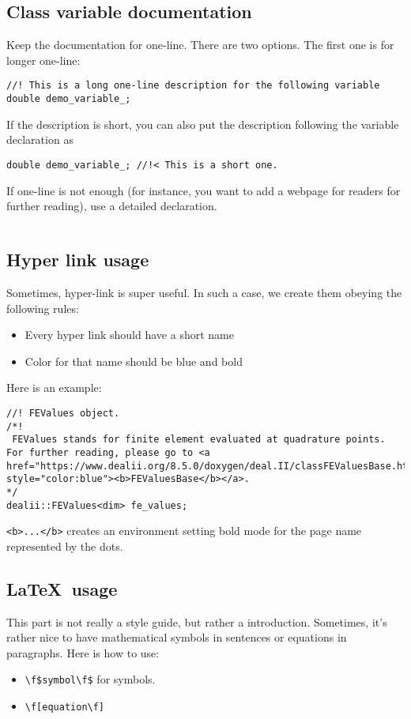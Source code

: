 \documentclass[openany]{book}
\newcommand{\latex}{\LaTeX}
\begin{document}
\subsection{Class variable documentation}
Keep the documentation for one-line. There are two options. The first one is for longer one-line:
\begin{lstlisting}
//! This is a long one-line description for the following variable
double demo_variable_;
\end{lstlisting}

If the description is short, you can also put the description following the variable declaration as
\begin{lstlisting}
double demo_variable_; //!< This is a short one.
\end{lstlisting}

If one-line is not enough (for instance, you want to add a webpage for readers for further reading), use a detailed declaration.
\begin{lstlisting}

\end{lstlisting}

\subsection{Hyper link usage}
Sometimes, hyper-link is super useful. In such a case, we create them obeying the following rules:
\begin{itemize}
	\item Every hyper link should have a short name
	\item Color for that name should be blue and bold
\end{itemize}

Here is an example:
\begin{lstlisting}
//! FEValues object.
/*!
 FEValues stands for finite element evaluated at quadrature points. For further reading, please go to <a href="https://www.dealii.org/8.5.0/doxygen/deal.II/classFEValuesBase.html" style="color:blue"><b>FEValuesBase</b></a>.
*/
dealii::FEValues<dim> fe_values;
\end{lstlisting}
{\tt <b>...</b>} creates an environment setting bold mode for the page name represented by the dots.

\subsection{\latex\ usage}
This part is not really a style guide, but rather a introduction. Sometimes, it's rather nice to have mathematical symbols in sentences or equations in paragraphs. Here is how to use:
\begin{itemize}
	\item {\tt \textbackslash f\$symbol\textbackslash f\$} for symbols.
	\item {\tt \textbackslash f[equation\textbackslash f]}
\end{itemize}
\end{document}
